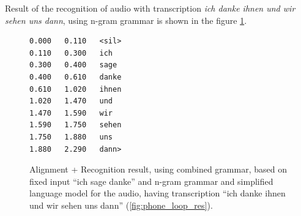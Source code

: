 Result of the recognition of audio with transcription \textit {ich danke ihnen
und wir sehen uns dann}, using n-gram grammar   is shown in
the figure  \ref{fig:ngram_res}.

\begin{figure}[htbp]
 \centering 
\begin{center}
\begin{lstlisting}[frame=single]
0.000	0.110	<sil>
0.110	0.300	ich
0.300	0.400	sage
0.400	0.610	danke
0.610	1.020	ihnen
1.020	1.470	und
1.470	1.590	wir
1.590	1.750	sehen
1.750	1.880	uns
1.880	2.290	dann>
\end{lstlisting}
\end{center}
 \caption{Alignment + Recognition result, using combined grammar, based on
 fixed input ``ich sage danke'' and n-gram grammar and simplified language
 model for the audio, having transcription ``ich danke ihnen und wir sehen uns
 dann'' (\ref{fig:phone_loop_res}).}
  \label{fig:ngram_res}
\end {figure}




















